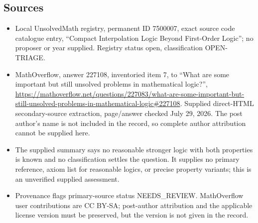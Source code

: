 \documentclass[11pt]{article}
\begin{document}
\subsection{Sources}
\begin{itemize}
\item Local UnsolvedMath registry, permanent ID 7500007, exact source code catalogue entry, ``Compact Interpolation Logic Beyond First-Order Logic''; no proposer or year supplied. Registry status open, classification OPEN-TRIAGE.
\item MathOverflow, answer 227108, inventoried item 7, to ``What are some important but still unsolved problems in mathematical logic?'', \url{https://mathoverflow.net/questions/227083/what-are-some-important-but-still-unsolved-problems-in-mathematical-logic#227108}. Supplied direct-HTML secondary-source extraction, page/answer checked July 29, 2026. The post author's name is not included in the record, so complete author attribution cannot be supplied here.
\item The supplied summary says no reasonable stronger logic with both properties is known and no classification settles the question. It supplies no primary reference, axiom list for reasonable logics, or precise property variants; this is an unverified supplied assessment.
\item Provenance flags primary-source status NEEDS\_REVIEW. MathOverflow user contributions are CC BY-SA; post-author attribution and the applicable license version must be preserved, but the version is not given in the record.
\end{itemize}
\end{document}
